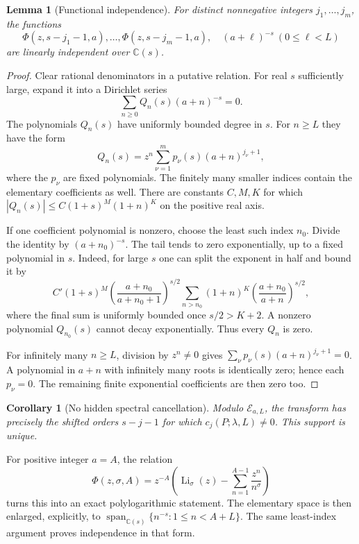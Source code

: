 \documentclass[11pt,letterpaper]{article}
\numberwithin{equation}{section}
\newtheorem{lemma}[theorem]{Lemma}
\newtheorem{corollary}[theorem]{Corollary}
\theoremstyle{definition}
\theoremstyle{remark}\newtheorem{remark}[theorem]{Remark}
\newcommand{\C}{\mathbb C}\newcommand{\Q}{\mathbb Q}
\newcommand{\Li}{\operatorname{Li}}
\newcommand{\E}{\mathcal E}
\DeclareMathOperator{\Span}{span}
\begin{document}
\begin{lemma}[Functional independence]\label{pls:lem:independence}
For distinct nonnegative integers $j_1,\ldots,j_m$, the functions
\[
 \Phi(z,s-j_1-1,a),\ldots,\Phi(z,s-j_m-1,a),
 \quad (a+\ell)^{-s}\ (0\le\ell<L)
\]
are linearly independent over $\C(s)$.
\end{lemma}
\begin{proof}
Clear rational denominators in a putative relation. For real $s$
sufficiently large, expand it into a Dirichlet series
\[
 \sum_{n\ge0}Q_n(s)(a+n)^{-s}=0.
\]
The polynomials $Q_n(s)$ have uniformly bounded degree in $s$. For
$n\ge L$ they have the form
\[
 Q_n(s)=z^n\sum_{\nu=1}^m p_\nu(s)(a+n)^{j_\nu+1},
\]
where the $p_\nu$ are fixed polynomials. The finitely many smaller
indices contain the elementary coefficients as well. There are
constants $C,M,K$ for which
$|Q_n(s)|\le C(1+s)^M(1+n)^K$ on the positive real axis.

If one coefficient polynomial is nonzero, choose the least such
index $n_0$. Divide the identity by $(a+n_0)^{-s}$. The tail tends
to zero exponentially, up to a fixed polynomial in $s$. Indeed, for
large $s$ one can split the exponent in half and bound it by
\[
 C'(1+s)^M
 \left(\frac{a+n_0}{a+n_0+1}\right)^{s/2}
 \sum_{n>n_0}(1+n)^K
          \left(\frac{a+n_0}{a+n}\right)^{s/2},
\]
where the final sum is uniformly bounded once $s/2>K+2$.
A nonzero polynomial $Q_{n_0}(s)$ cannot decay exponentially.
Thus every $Q_n$ is zero.

For infinitely many $n\ge L$, division by $z^n\ne0$ gives
$\sum_\nu p_\nu(s)(a+n)^{j_\nu+1}=0$. A polynomial in $a+n$
with infinitely many roots is identically zero; hence each $p_\nu=0$.
The remaining finite exponential coefficients are then zero too.
\end{proof}

\begin{corollary}[No hidden spectral cancellation]\label{pls:cor:support}
Modulo $\E_{a,L}$, the transform has precisely the shifted orders
$s-j-1$ for which $c_j(P;\lambda,L)\ne0$. This support is unique.
\end{corollary}

For positive integer $a=A$, the relation
\begin{equation}\label{pls:eq:integerLi}
 \Phi(z,\sigma,A)=z^{-A}\left(\Li_\sigma(z)
                -\sum_{n=1}^{A-1}\frac{z^n}{n^\sigma}\right)
\end{equation}
turns this into an exact polylogarithmic statement. The elementary
space is then enlarged, explicitly, to
$\Span_{\C(s)}\{n^{-s}:1\le n<A+L\}$.
The same least-index argument proves independence in that form.
\end{document}
